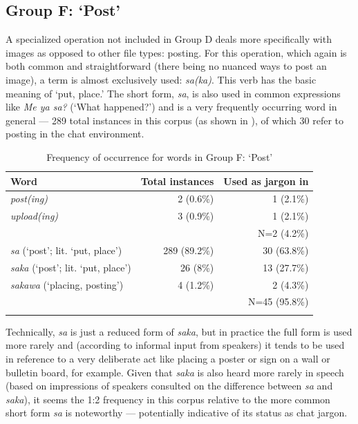 \documentclass[output=paper
,newtxmath
,modfonts
,nonflat]{langsci/langscibook}
\begin{document}
\subsection{Group F: ‘Post’}

A specialized operation not included in Group D deals more specifically with images as opposed to other file types: posting. For this operation, which again is both common and straightforward (there being no nuanced ways to post an image), a  term is almost exclusively used: \textit{sa(ka)}. This verb has the basic meaning of ‘put, place.’ The short form, \textit{sa}, is also used in common expressions like \textit{Me ya sa?} (‘What happened?’) and is a very frequently occurring word in general — 289 total instances in this corpus (as shown in ), of which 30 refer to posting in the chat environment. 

\begin{table}
\begin{tabularx}{\textwidth}{Qrr}
\lsptoprule
Word & Total instances & Used as jargon in \\
\midrule
\textit{post(ing)}   & 2 (0.6\%) & 1 (2.1\%)\\
\textit{upload(ing)} & 3 (0.9\%) & 1 (2.1\%)\\\midrule
& & N=2 (4.2\%)\\\midrule
\textit{sa} (‘post’; lit. ‘put, place’)   & 289 (89.2\%) & 30 (63.8\%)\\
\textit{saka} (‘post’; lit. ‘put, place’) & 26 (8\%) & 13 (27.7\%)\\
\textit{sakawa} (‘placing, posting’)      & 4 (1.2\%) & 2 (4.3\%)\\\midrule
& & N=45 (95.8\%)\\
\lspbottomrule
\end{tabularx}
\caption{Frequency of occurrence for words in Group F: ‘Post’}
\label{tab:purvis:8}
\end{table} 

Technically, \textit{sa} is just a reduced form of \textit{saka}, but in practice the full form is used more rarely and (according to informal input from  speakers) it tends to be used in reference to a very deliberate act like placing a poster or sign on a wall or bulletin board, for example. Given that \textit{saka} is also heard more rarely in speech (based on impressions of  speakers consulted on the difference between \textit{sa} and \textit{saka}), it seems the 1:2 frequency in this corpus relative to the more common short form \textit{sa} is noteworthy — potentially indicative of its status as chat jargon.
\end{document}
